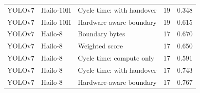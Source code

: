 \begin{longtable}{@{}llp{5.3cm}rr@{}}
YOLOv7 & Hailo-10H & Cycle time: with handover & 19 & 0.348 \\
YOLOv7 & Hailo-10H & Hardware-aware boundary & 19 & 0.615 \\
YOLOv7 & Hailo-8 & Boundary bytes & 17 & 0.670 \\
YOLOv7 & Hailo-8 & Weighted score & 17 & 0.650 \\
YOLOv7 & Hailo-8 & Cycle time: compute only & 17 & 0.591 \\
YOLOv7 & Hailo-8 & Cycle time: with handover & 17 & 0.743 \\
YOLOv7 & Hailo-8 & Hardware-aware boundary & 17 & 0.767 \\
\bottomrule\end{longtable}
